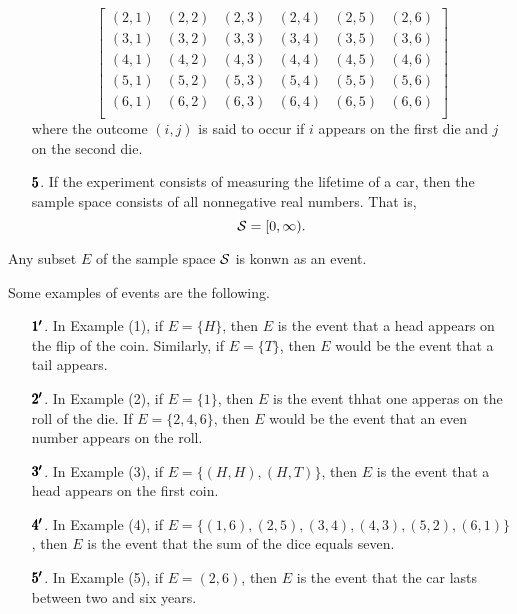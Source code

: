 \begin{enumerate}
\begin{equation*}
\begin{bmatrix}
            (2,1) & (2,2) & (2,3) & (2,4) & (2,5) & (2,6) \\ 
            (3,1) & (3,2) & (3,3) & (3,4) & (3,5) & (3,6) \\ 
            (4,1) & (4,2) & (4,3) & (4,4) & (4,5) & (4,6) \\ 
            (5,1) & (5,2) & (5,3) & (5,4) & (5,5) & (5,6) \\ 
            (6,1) & (6,2) & (6,3) & (6,4) & (6,5) & (6,6) \\ 
        \end{bmatrix}
    \end{equation*}
    where the outcome $(i,j)$ is said to occur if $i$ appears on the first die and $j$ on the second die. 
    \item[$\pmb{5}$.] If the experiment consists of measuring the lifetime of a car, then the sample space consists of all nonnegative real numbers. That is, 
    \begin{equation*}
        \mathcal{S} = [0, \infty).
    \end{equation*}
\end{enumerate}

\begin{definition}[Events]
    Any subset $E$ of the sample space $\mathcal{S}$ is konwn as an event. 
\end{definition}

Some examples of events are the following.

\begin{enumerate}
    \item[$\pmb{1'}$.] In Example (1), if $E = \{H\}$, then $E$ is the event that a head appears on the flip of the coin. Similarly, if $E = \{T\}$, then $E$ would be the event that a tail appears.
    \item[$\pmb{2'}$.] In Example (2), if $E = \{1\}$, then $E$ is the event thhat one apperas on the roll of the die. If $E = \{2,4,6\}$, then $E$ would be the event that an even number appears on the roll.
    \item[$\pmb{3'}$.] In Example (3), if $E = \{(H,H), (H,T)\}$, then $E$ is the event that a head appears on the first coin. 
    \item[$\pmb{4'}$.] In Example (4), if $E = \{(1,6), (2,5), (3,4), (4,3), (5,2), (6,1)\}$, then $E$ is the event that the sum of the dice equals seven. 
    \item[$\pmb{5'}$.] In Example (5), if $E = (2,6)$, then $E$ is the event that the car lasts between two and six years. 
\end{enumerate}

